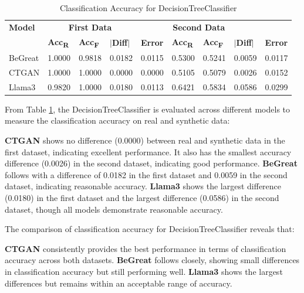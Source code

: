 \begin{table}[H]
\centering
\caption{Classification Accuracy for DecisionTreeClassifier}
\label{tab:decision_tree_accuracy_combined}
\begin{tabularx}{\textwidth}{l*{8}{X}}
    \toprule
    \textbf{Model} & \multicolumn{3}{c}{\textbf{First Data}} & \multicolumn{4}{c}{\textbf{Second Data}} \\
    \cmidrule(lr){2-4} \cmidrule(lr){5-8}
    & \textbf{Acc\textsubscript{R}} & \textbf{Acc\textsubscript{F}} & \textbf{$|$Diff$|$} & \textbf{Error} & \textbf{Acc\textsubscript{R}} & \textbf{Acc\textsubscript{F}} & \textbf{$|$Diff$|$} & \textbf{Error} \\
    \midrule
    BeGreat & 1.0000 & 0.9818 & 0.0182 & 0.0115 & 0.5300 & 0.5241 & 0.0059 & 0.0117 \\
    CTGAN & 1.0000 & 1.0000 & 0.0000 & 0.0000 & 0.5105 & 0.5079 & 0.0026 & 0.0152 \\
    Llama3 & 0.9820 & 1.0000 & 0.0180 & 0.0113 & 0.6421 & 0.5834 & 0.0586 & 0.0299 \\
    \bottomrule
\end{tabularx}
\end{table}


From Table \ref{tab:decision_tree_accuracy_combined}, the DecisionTreeClassifier is evaluated across different models to measure the classification accuracy on real and synthetic data:

\textbf{CTGAN} shows no difference (0.0000) between real and synthetic data in the first dataset, indicating excellent performance. It also has the smallest accuracy difference (0.0026) in the second dataset, indicating good performance.
\textbf{BeGreat} follows with a difference of 0.0182 in the first dataset and 0.0059 in the second dataset, indicating reasonable accuracy.
\textbf{Llama3} shows the largest difference (0.0180) in the first dataset and the largest difference (0.0586) in the second dataset, though all models demonstrate reasonable accuracy.

\vspace{0.5cm}

The comparison of classification accuracy for DecisionTreeClassifier reveals that:

\textbf{CTGAN} consistently provides the best performance in terms of classification accuracy across both datasets.
\textbf{BeGreat} follows closely, showing small differences in classification accuracy but still performing well.
\textbf{Llama3} shows the largest differences but remains within an acceptable range of accuracy.

